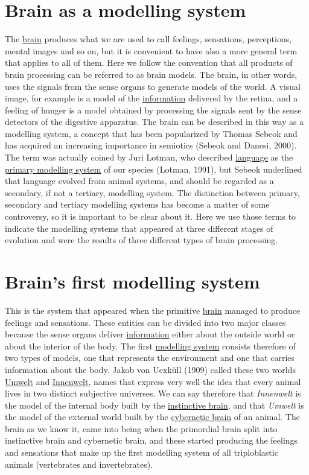 \documentclass[12pt]{article}
\begin{document}
\section{Brain as a modelling system}
The \hyperlink{brain}{brain} produces what we are used to call feelings, sensations, perceptions, mental images and so on, but it is convenient to have also a more general term that applies to all of them. Here we follow the convention that all products of brain processing can be referred to as brain models. The brain, in other words, uses the signals from the sense organs to generate models of the world. A visual image, for example is a model of the \hyperlink{information}{information} delivered by the retina, and a feeling of hunger is a model obtained by processing the signals sent by the sense detectors of the digestive apparatus. The brain can be described in this way as a modelling system, a concept that has been popularized by Thomas Sebeok and has acquired an increasing importance in semiotics (Sebeok and Danesi, 2000). The term was actually coined by Juri Lotman, who described \hyperlink{language}{language} as the \hyperlink{brains_first_modelling_system}{primary modelling system} of our species (Lotman, 1991), but Sebeok underlined that language evolved from animal systems, and should be regarded as a secondary, if not a tertiary, modelling system. The distinction between primary, secondary and tertiary modelling systems has become a matter of some controversy, so it is important to be clear about it. Here we use those terms to indicate the modelling systems that appeared at three different stages of evolution and were the results of three different types of brain processing. 


\hypertarget{brains_first_modelling_system}{}
\section{Brain's first modelling system}
This is the system that appeared when the primitive \hyperlink{brain}{brain} managed to produce feelings and sensations. These entities can be divided into two major classes because the sense organs deliver \hyperlink{information}{information} either about the outside world or about the interior of the body. The first \hyperlink{modelling_systems}{modelling system} consists therefore of two types of models, one that represents the environment and one that carries information about the body. Jakob von Uexküll (1909) called these two worlds \hyperlink{umwelt}{Umwelt} and \hyperlink{innenwelt}{Innenwelt}, names that express very well the idea that every animal lives in two distinct subjective universes. We can say therefore that \textit{Innenwelt} is the model of the internal body built by the \hyperlink{instinctive_brain}{instinctive brain}, and that \textit{Umwelt} is the model of the external world built by the \hyperlink{cybernetic_brain}{cybernetic brain} of an animal. The brain as we know it, came into being when the primordial brain split into instinctive brain and cybernetic brain, and these started producing the feelings and sensations that make up the first modelling system of all triploblastic animals (vertebrates and invertebrates). 
\end{document}
